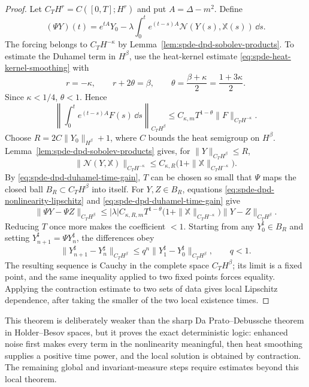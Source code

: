 \begin{proof}
Let \(C_T H^r=C([0,T];H^r)\) and put \(A=\Delta-m^2\).  Define
\[
  (\Psi Y)(t)
  =
  e^{tA}Y_0
  -
  \lambda\int_0^t e^{(t-s)A}\mathcal N(Y(s),\mathbb X(s))\,\dd s .
\]
The forcing belongs to \(C_T H^{-\kappa}\) by
Lemma~\ref{lem:spde-dpd-sobolev-products}.  To estimate the Duhamel term in
\(H^\beta\), use the heat-kernel estimate
\eqref{eq:spde-heat-kernel-smoothing} with
\[
  r=-\kappa,\qquad
  r+2\theta=\beta,\qquad
  \theta=\frac{\beta+\kappa}{2}=\frac{1+3\kappa}{2}.
\]
Since \(\kappa<1/4\), \(\theta<1\).  Hence
\begin{equation}
  \left\|
    \int_0^t e^{(t-s)A}F(s)\,\dd s
  \right\|_{C_TH^\beta}
  \leq
  C_{\kappa,m}T^{1-\theta}\|F\|_{C_TH^{-\kappa}} .
  \label{eq:spde-dpd-duhamel-time-gain}
\end{equation}
Choose \(R=2C\|Y_0\|_{H^\beta}+1\), where \(C\) bounds the heat semigroup
on \(H^\beta\).  Lemma~\ref{lem:spde-dpd-sobolev-products} gives, for
\(\|Y\|_{C_TH^\beta}\leq R\),
\[
  \|\mathcal N(Y,\mathbb X)\|_{C_TH^{-\kappa}}
  \leq
  C_{\kappa,R}\bigl(1+\|\mathbb X\|_{C_TH^{-\kappa}}\bigr).
\]
By \eqref{eq:spde-dpd-duhamel-time-gain}, \(T\) can be chosen so small that
\(\Psi\) maps the closed ball \(B_R\subset C_TH^\beta\) into itself.
For \(Y,Z\in B_R\), equations
\eqref{eq:spde-dpd-nonlinearity-lipschitz} and
\eqref{eq:spde-dpd-duhamel-time-gain} give
\[
  \|\Psi Y-\Psi Z\|_{C_TH^\beta}
  \leq
  |\lambda|C_{\kappa,R,m}
  T^{1-\theta}
  \bigl(1+\|\mathbb X\|_{C_TH^{-\kappa}}\bigr)
  \|Y-Z\|_{C_TH^\beta}.
\]
Reducing \(T\) once more makes the coefficient \(<1\).  Starting from
any \(Y_0^\sharp\in B_R\) and setting \(Y_{n+1}^\sharp=\Psi Y_n^\sharp\),
the differences obey
\[
  \|Y_{n+1}^\sharp-Y_n^\sharp\|_{C_TH^\beta}
  \leq q^n\|Y_1^\sharp-Y_0^\sharp\|_{C_TH^\beta},
  \qquad q<1.
\]
The resulting sequence is Cauchy in the complete space \(C_TH^\beta\);
its limit is a fixed point, and the same inequality applied to two fixed
points forces equality.  Applying the contraction estimate to two sets of
data gives local Lipschitz dependence, after taking the smaller of the two
local existence times.
\end{proof}

This theorem is deliberately weaker than the sharp Da Prato--Debussche
theorem in Holder--Besov spaces, but it proves the exact deterministic
logic: enhanced noise first makes every term in the nonlinearity meaningful,
then heat smoothing supplies a positive time power, and the local solution
is obtained by contraction.  The remaining global and invariant-measure
steps require estimates beyond this local theorem.

